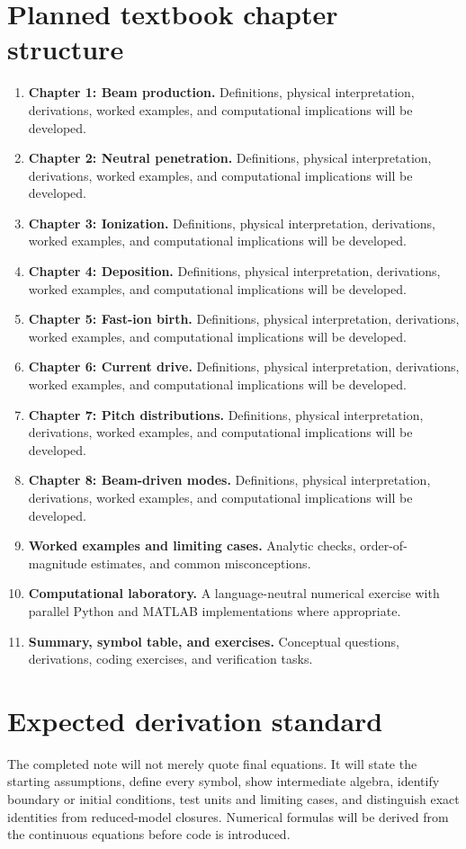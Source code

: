 \documentclass[11pt]{article}
\begin{document}
\section{Planned textbook chapter structure}
\begin{enumerate}[leftmargin=1.8em]
\item \textbf{Chapter 1: Beam production.} Definitions, physical interpretation, derivations, worked examples, and computational implications will be developed.
\item \textbf{Chapter 2: Neutral penetration.} Definitions, physical interpretation, derivations, worked examples, and computational implications will be developed.
\item \textbf{Chapter 3: Ionization.} Definitions, physical interpretation, derivations, worked examples, and computational implications will be developed.
\item \textbf{Chapter 4: Deposition.} Definitions, physical interpretation, derivations, worked examples, and computational implications will be developed.
\item \textbf{Chapter 5: Fast-ion birth.} Definitions, physical interpretation, derivations, worked examples, and computational implications will be developed.
\item \textbf{Chapter 6: Current drive.} Definitions, physical interpretation, derivations, worked examples, and computational implications will be developed.
\item \textbf{Chapter 7: Pitch distributions.} Definitions, physical interpretation, derivations, worked examples, and computational implications will be developed.
\item \textbf{Chapter 8: Beam-driven modes.} Definitions, physical interpretation, derivations, worked examples, and computational implications will be developed.
\item \textbf{Worked examples and limiting cases.} Analytic checks, order-of-magnitude estimates, and common misconceptions.
\item \textbf{Computational laboratory.} A language-neutral numerical exercise with parallel Python and MATLAB implementations where appropriate.
\item \textbf{Summary, symbol table, and exercises.} Conceptual questions, derivations, coding exercises, and verification tasks.
\end{enumerate}

\section{Expected derivation standard}
The completed note will not merely quote final equations. It will state the starting assumptions, define every symbol, show intermediate algebra, identify boundary or initial conditions, test units and limiting cases, and distinguish exact identities from reduced-model closures. Numerical formulas will be derived from the continuous equations before code is introduced.
\end{document}
